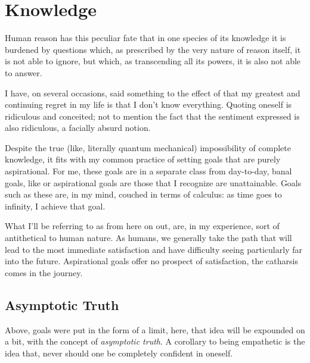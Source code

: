 \documentclass[../butidigress.tex]{subfiles}
\begin{document}
\chapter{Knowledge}\label{chap:knowledge}
\epigraph{Human reason has this peculiar fate that in one species of its knowledge it is burdened by questions which, as prescribed by the very nature of reason itself, it is not able to ignore, but which, as transcending all its powers, it is also not able to answer.}{}
\newpage

I have, on several occasions, said something to the effect of that my greatest and continuing regret in my life is that I don't know everything.
Quoting oneself is ridiculous and conceited; not to mention the fact that the sentiment expressed is also ridiculous, a facially absurd notion.

Despite the true (like, literally quantum mechanical) impossibility of complete knowledge, it fits with my common practice of setting goals that are purely aspirational.
For me, these goals are in a separate class from day-to-day, banal goals, like  or  aspirational goals are those that I recognize are unattainable.
Goals such as these are, in my mind, couched in terms of calculus: as time goes to infinity, I achieve that goal.

What I'll be referring to as  from here on out, are, in my experience, sort of antithetical to human nature.
As humans, we generally take the path that will lead to the most immediate satisfaction and have difficulty seeing particularly far into the future.
Aspirational goals offer no prospect of satisfaction, the catharsis comes in the journey.

\section{Asymptotic Truth}\label{sec:asymptotic}
Above, goals were put in the form of a limit, here, that idea will be expounded on a bit, with the concept of \emph{asymptotic truth}.
A corollary to being empathetic is the idea that, never should one be completely confident in oneself.
\end{document}
